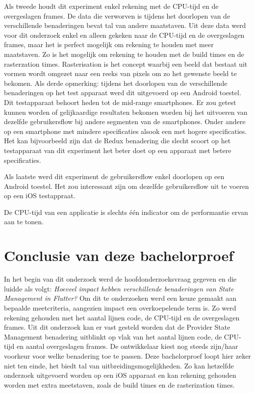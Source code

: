 Als tweede houdt dit experiment enkel rekening met de CPU-tijd en de overgeslagen frames. De data die verworven is tijdens het doorlopen van de verschillende benaderingen bevat tal van andere maatstaven. Uit deze data werd voor dit onderzoek enkel en alleen gekeken naar de CPU-tijd en de overgeslagen frames, maar het is perfect mogelijk om rekening te houden met meer maatstaven. Zo is het mogelijk om rekening te houden met de build times en de rasterzation times. Rasterisation is het concept waarbij een beeld dat bestaat uit vormen wordt omgezet naar een reeks van pixels om zo het gewenste beeld te bekomen. \newline \newline
Als derde opmerking: tijdens het doorlopen van de verschillende benaderingen op het test apparaat werd dit uitgevoerd op een Android toestel. Dit testapparaat behoort heden tot de mid-range smartphones. Er zou getest kunnen worden of gelijkaardige resultaten bekomen worden bij het uitvoeren van dezelfde gebruikersflow bij andere segmenten van de smartphones. Onder andere op een smartphone met mindere specificaties alsook een met hogere specificaties. Het kan bijvoorbeeld zijn dat de Redux benadering die slecht scoort op het testapparaat van dit experiment het beter doet op een apparaat met betere specificaties. 

Als laatste werd dit experiment de gebruikersflow enkel doorlopen op een Android toestel. Het zou interessant zijn om dezelfde gebruikersflow uit te voeren op een iOS testappraat. 

De CPU-tijd van een applicatie is slechts één indicator om de performantie ervan aan te tonen.

\section{Conclusie van deze bachelorproef}
In het begin van dit onderzoek werd de hoofdonderzoeksvraag gegeven en die luidde als volgt: \textit{Hoeveel impact hebben verschillende benaderingen van State Management in Flutter?} Om dit te onderzoeken werd een keuze gemaakt aan bepaalde meetcriteria, aangezien impact een overkoepelende term is. Zo werd rekening gehouden met het aantal lijnen code, de CPU-tijd en de overgeslagen frames. \newline \newline
Uit dit onderzoek kan er vast gesteld worden dat de Provider State Management benadering uitblinkt op vlak van het aantal lijnen code, de CPU-tijd en aantal overgeslagen frames. \newline
De ontwikkelaar kiest nog steeds zijn/haar voorkeur voor welke benadering toe te passen. \newline \newline
Deze bachelorproef loopt hier zeker niet ten einde, het biedt tal van uitbreidingsmogelijkheden. Zo kan hetzelfde onderzoek uitgevoerd worden op een iOS apparaat en kan rekening gehouden worden met extra meetstaven, zoals de build times en de rasterization times.